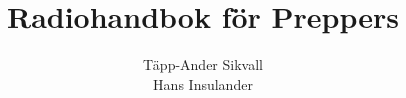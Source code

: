 \documentclass[12ypt,swedish,a4paper]{report}
\begin{document}
\title{Radiohandbok för Preppers}
\author{Täpp-Ander Sikvall\\Hans Insulander}
\maketitle

\listoftodos
\clearpage



\tableofcontents

\setlength{\parskip}{1em plus 0.3em minus 0.1em}
\setlength{\parindent}{0pt}

\pagestyle{fancy}

\lhead{\nouppercase{\leftmark}}
\chead{}
\rhead{\nouppercase{\rightmark}}

\cfoot{\thepage}

\renewcommand{\headrulewidth}{0.2pt}
\renewcommand{\footrulewidth}{0.2pt}







\end{document}
